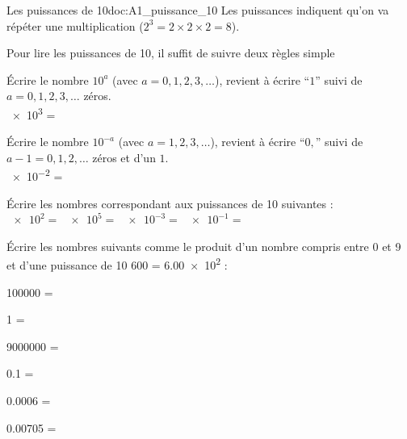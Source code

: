 \teteSndMeth

\vspace*{-36pt}


\vspace*{-20pt}
\vspace*{-8pt}

\begin{doc}{Les puissances de 10}{doc:A1_puissance_10}
  Les puissances indiquent qu'on va répéter une multiplication ($2^3 = 2 \times 2 \times 2 = 8$).
  
  Pour lire les puissances de 10, il suffit de suivre deux règles simple
  \begin{importants}
    \pointCyan Écrire le nombre $10^a$ (avec $a = 0, 1, 2, 3, \ldots$), revient à écrire ``$1$'' suivi de $a = 0, 1, 2, 3, \ldots$ zéros. \\
    \exemple \num{e3} = 

    \pointCyan Écrire le nombre $10^{-a}$ (avec $a = 1, 2, 3, \ldots$), revient à écrire ``$0,$'' suivi de $a - 1 = 0, 1, 2, \ldots$ zéros et d'un $1$. \\
    \exemple \num{e-2} = 
  \end{importants}
\end{doc}


\numeroQuestion Écrire les nombres correspondant aux puissances de 10 suivantes : \\
$\num{e2}  =$  \qq{}
$\num{e5}  =$  \qq{}
$\num{e-3} =$  \qq{}
$\num{e-1} =$ 

\numeroQuestion Écrire les nombres suivants comme le produit d'un nombre compris entre 0 et 9 et d'une puissance de 10 \exemple \num{600} = \num{6,00e2} :
\begin{multicols}{2}
  \begin{listePoints}
    \item \num{100000}  = 
    \item \num{1}       = 
    \item \num{9000000} = 
    \item \num{0,1}     = 
    \item \num{0,0006}  = 
    \item \num{0,00705} = 
  \end{listePoints}
\end{multicols}


